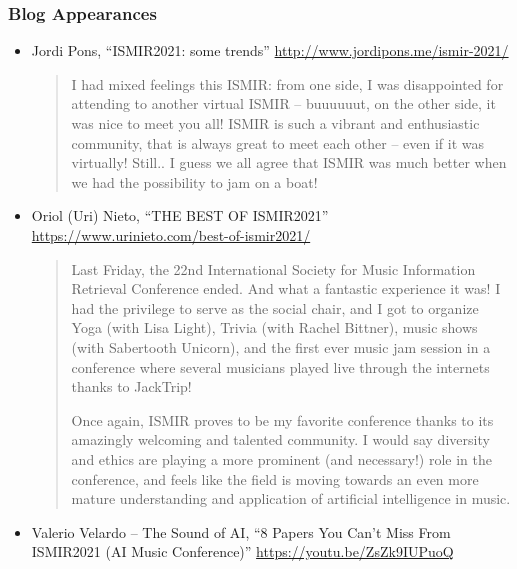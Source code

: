 \documentclass[%
10pt,								%
titlepage,						%
]
{scrartcl}
\begin{document}
        \subsubsection{Blog Appearances}
            \begin{itemize}
                \item   Jordi Pons, ``ISMIR2021: some trends'' \href{http://www.jordipons.me/ismir-2021/}{http://www.jordipons.me/ismir-2021/ }
                
                    \begin{quote}
                        I had mixed feelings this ISMIR: from one side, I was disappointed for attending to another virtual ISMIR -- buuuuuut, on the other side, it was nice to meet you all! ISMIR is such a vibrant and enthusiastic community, that is always great to meet each other -- even if it was virtually! Still.. I guess we all agree that ISMIR was much better when we had the possibility to jam on a boat! 
                    \end{quote}
                    
                \item   Oriol (Uri) Nieto, ``THE BEST OF ISMIR2021'' \href{https://www.urinieto.com/best-of-ismir2021/ }{https://www.urinieto.com/best-of-ismir2021/ }
                
                    \begin{quote}
                        Last Friday, the 22nd International Society for Music Information Retrieval Conference ended. And what a fantastic experience it was! I had the privilege to serve as the social chair, and I got to organize Yoga (with Lisa Light), Trivia (with Rachel Bittner), music shows (with Sabertooth Unicorn), and the first ever music jam session in a conference where several musicians played live through the internets thanks to JackTrip!

Once again, ISMIR proves to be my favorite conference thanks to its amazingly welcoming and talented community. I would say diversity and ethics are playing a more prominent (and necessary!) role in the conference, and feels like the field is moving towards an even more mature understanding and application of artificial intelligence in music.
                    \end{quote}

                \item   Valerio Velardo -- The Sound of AI, ``8 Papers You Can't Miss From ISMIR2021 (AI Music Conference)'' \href{https://youtu.be/ZsZk9IUPuoQ}{https://youtu.be/ZsZk9IUPuoQ}
                

\end{itemize}
\end{document}
